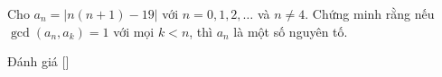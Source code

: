 \ifshowproblem
\begin{problem}\label{problem:POL-2015-MO2-P3}
    Cho \( a_n = |n(n+1) - 19| \) với \( n = 0, 1, 2, \ldots \) và \( n \ne 4 \).
    Chứng minh rằng nếu \( \gcd(a_n, a_k) = 1 \) với mọi \( k < n \), thì \( a_n \) là một số nguyên tố.
\end{problem}
\fi

\ifshowinfo
Đánh giá [\textbf{}]\footnotemark
{}
\fi